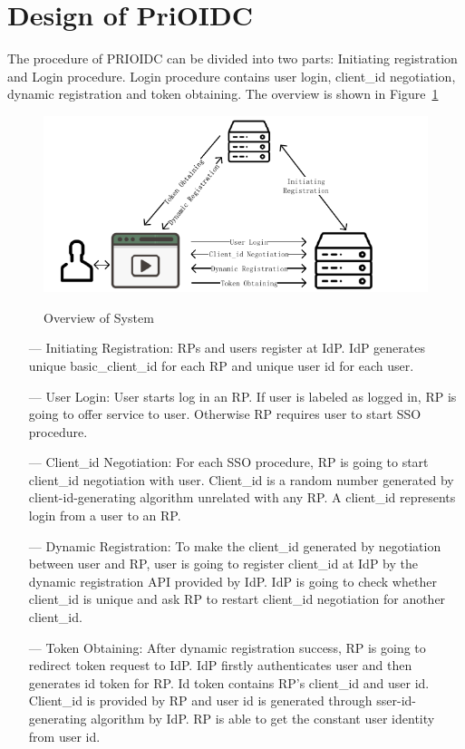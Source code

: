 \section{Design of PriOIDC}
\label{sec:protocol}
The procedure of PRIOIDC can be divided into two parts: Initiating registration and Login procedure. Login procedure contains user login, client\_id negotiation, dynamic registration and token obtaining. The overview is shown in Figure~\ref{fig:overview}
\begin{figure}
  \centering
  \includegraphics[width=\linewidth]{fig/prioidc.pdf}\label{fig:overview}
  \caption{Overview of System}
  \label{fig:overview}
\end{figure}
\begin{itemize}
\item[---] Initiating Registration: RPs and users register at IdP. IdP generates unique basic\_client\_id for each RP and unique user id for each user.
\item[---] User Login: User starts log in an RP. If user is labeled as logged in, RP is going to offer service to user. Otherwise RP requires user to start SSO procedure. 
\item[---] Client\_id Negotiation: For each SSO procedure, RP is going to start client\_id negotiation with user. Client\_id is a random number generated by client-id-generating algorithm unrelated with any RP. A client\_id represents login from a user to an RP.
\item[---] Dynamic Registration: To make the client\_id generated by negotiation between user and RP, user is going to register client\_id at IdP by the dynamic registration API provided by IdP. IdP is going to check whether client\_id is unique and ask RP to restart client\_id negotiation for another client\_id.
\item[---] Token Obtaining: After dynamic registration success, RP is going to redirect token request to IdP. IdP firstly authenticates user and then generates id token for RP. Id token contains RP's client\_id and user id. Client\_id is provided by RP and user id is generated through sser-id-generating algorithm by IdP. RP is able to get the constant user identity from user id.
\end{itemize}

